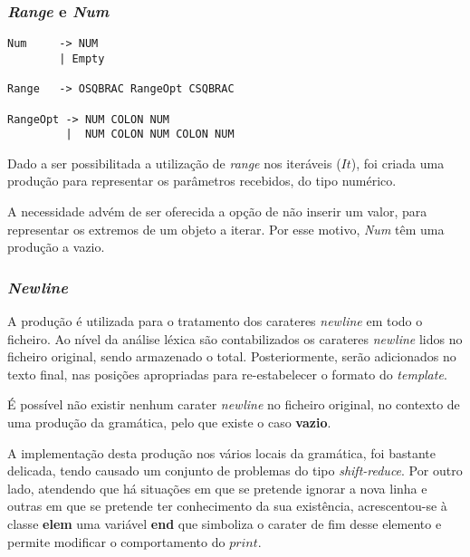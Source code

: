 \documentclass[../relatorio.tex]{subfiles}
\begin{document}
\subsubsection{\textit{Range} e \textit{Num}} \label{grm:num}
\begin{verbatim}
Num     -> NUM
        | Empty

Range   -> OSQBRAC RangeOpt CSQBRAC

RangeOpt -> NUM COLON NUM
         |  NUM COLON NUM COLON NUM
\end{verbatim}
Dado a ser possibilitada a utilização de \textit{range} nos iteráveis ($It$),
foi criada uma produção para representar os parâmetros recebidos, do tipo numérico.

A necessidade advém de ser oferecida a opção de não inserir um valor, para representar
os extremos de um objeto a iterar.
Por esse motivo, \textit{Num} têm uma produção a vazio.

\subsubsection{\textit{Newline}} \label{grm:nl}
A produção é utilizada para o tratamento dos carateres \textit{newline}
em todo o ficheiro.
Ao nível da análise léxica são contabilizados os carateres \textit{newline}
lidos no ficheiro original, sendo armazenado o total.
Posteriormente, serão adicionados no texto final, nas 
posições apropriadas para re-estabelecer o formato do \textit{template}.

É possível não existir nenhum carater \textit{newline} no ficheiro original,
no contexto de uma produção da gramática, pelo que existe o caso \textbf{vazio}.

A implementação desta produção nos vários locais da gramática, foi 
bastante delicada, tendo causado um conjunto de problemas do tipo 
\textit{shift-reduce}.
Por outro lado, atendendo que há situações em que se pretende ignorar a nova linha
e outras em que se pretende ter conhecimento da sua existência, acrescentou-se à classe
\textbf{elem} uma variável \textbf{end} que simboliza o carater de fim desse elemento 
e permite modificar o comportamento do $print$.
\end{document}
